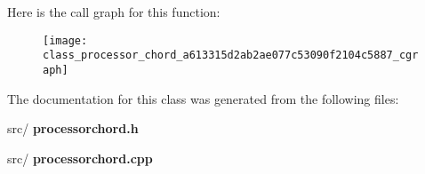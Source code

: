 Here is the call graph for this function\+:\nopagebreak
\begin{figure}[H]
\begin{center}
\leavevmode
\texttt{[image: class\_processor\_chord\_a613315d2ab2ae077c53090f2104c5887\_cgraph]}
\end{center}
\end{figure}


The documentation for this class was generated from the following files\+:\begin{DoxyCompactItemize}
\item 
src/\textbf{ processorchord.\+h}\item 
src/\textbf{ processorchord.\+cpp}\end{DoxyCompactItemize}
